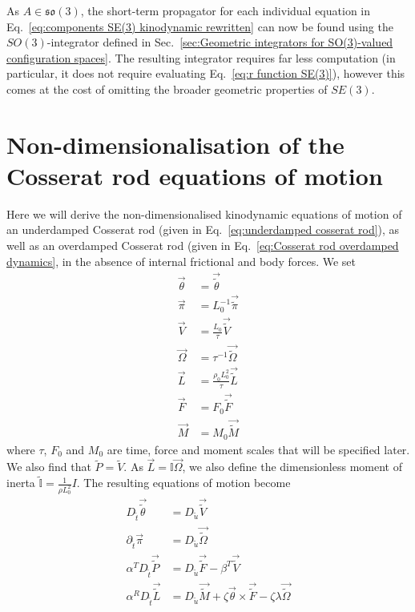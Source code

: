 \documentclass[]{cam-thesis}
\begin{document}
As $A \in \mathfrak{so}(3)$, the short-term propagator for each individual equation in Eq.~\ref{eq:components SE(3) kinodynamic rewritten} can now be found using the $SO(3)$-integrator defined in Sec.~\ref{sec:Geometric integrators for SO(3)-valued configuration spaces}. The resulting integrator requires far less computation (in particular, it does not require evaluating Eq.~\ref{eq:r function SE(3)}), however this comes at the cost of omitting the broader geometric properties of $SE(3)$.


\chapter{Non-dimensionalisation of the Cosserat rod equations of motion} \label{app:Nondimensionalisation of the Cosserat rod}

Here we will derive the non-dimensionalised kinodynamic equations of motion of an underdamped Cosserat rod (given in Eq.~\ref{eq:underdamped cosserat rod}), as well as an overdamped Cosserat rod (given in Eq.~\ref{eq:Cosserat rod overdamped dynamics}, in the absence of internal frictional and body forces. We set
\begin{align*}
\vec{\theta} & =\vec{\tilde{\theta}}\\
\vec{\pi} & =L_{0}^{-1}\vec{\tilde{\pi}}\\
\vec{V} & =\frac{L_{0}}{\tau}\vec{\tilde{V}}\\
\vec{\Omega} & =\tau^{-1}\vec{\tilde{\Omega}}\\
\vec{L} & =\frac{\rho_0 L_{0}^{2}}{\tau}\vec{\tilde{L}}\\
\vec{F} & =F_{0}\vec{\tilde{F}}\\
\vec{M} & =M_{0}\vec{\tilde{M}}
\end{align*}
where $\tau$, $F_{0}$ and $M_{0}$ are time, force and moment scales
that will be specified later. We also find that $\tilde{P} = \tilde{V}$. As $\vec{L}= \mathbb{I} \vec{\Omega}$, we also
define the dimensionless moment of inerta $\tilde{\mathbb{I}}=\frac{1}{\rho L_{0}^{2}}I$.
The resulting equations of motion become
\begin{align}
D_{\tilde{t}}\vec{\tilde{\theta}} & =D_{\tilde{u}}\vec{\tilde{V}}\\
\partial_{\tilde{t}}\vec{\pi} & =D_{\tilde{u}}\vec{\tilde{\Omega}}\\
\alpha^{T}D_{\tilde{t}}\vec{\tilde{P}} & =D_{\tilde{u}}\vec{\tilde{F}}-\beta^{T}\vec{\tilde{V}}\\
\alpha^{R}D_{\tilde{t}}\vec{\tilde{L}} & =D_{\tilde{u}}\vec{\tilde{M}}+\zeta\vec{\theta}\times\vec{\tilde{F}}-\zeta\lambda\vec{\tilde{\Omega}}
\end{align}
\end{document}
